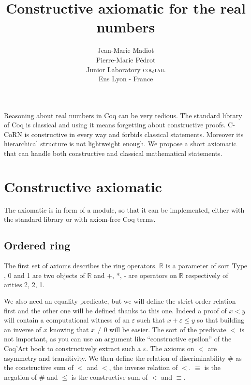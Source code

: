 \documentclass[a4paper,11pt]{article}
\newcommand{\R}{\mathbb{R}}
\newcommand{\Type}{\mbox{Type}}
\newcommand{\coqtail}{\textsc{coqtail}}
\theoremstyle{definition}
\theoremstyle{remark}
\begin{document}
\title{Constructive axiomatic for the real numbers}
\author{
Jean-Marie Madiot\\
Pierre-Marie Pédrot\\
Junior Laboratory \coqtail{}\\
Ens Lyon - France\\}

\maketitle 

  Reasoning about real numbers in Coq can be very tedious. The standard library of Coq is classical and using it means forgetting about constructive proofs. C-CoRN is constructive in every way and forbids classical statements. Moreover its hierarchical structure is not lightweight enough. We propose a short axiomatic that can handle both constructive and classical mathematical statements.

\section{Constructive axiomatic}

The axiomatic is in form of a module, so that it can be implemented, either with the standard library or with axiom-free Coq terms.

\subsection{Ordered ring}

The first set of axioms describes the ring operators. $\R$ is a parameter of sort $\Type$, 0 and 1 are two objects of $\R$ and +, *, - are operators on $\R$ respectively of arities 2, 2, 1.

We also need an equality predicate, but we will define the strict order relation first and the other one will be defined thanks to this one. Indeed a proof of $x<y$ will contain a computational witness of an $\varepsilon$ such that $x+\varepsilon≤y$ so that building an inverse of $x$ knowing that $x\neq 0$ will be easier. The sort of the predicate $<$ is not important, as you can use an argument like ``constructive epsilon'' of the Coq’Art book to constructively extract such a $\varepsilon$. The axioms on $<$ are asymmetry and transitivity. We then define the relation of discriminability $\#$ as the constructive sum of $<$ and $<$, the inverse relation of $<$. $≡$ is the negation of $\#$ and $≤$ is the constructive sum of $<$ and $≡$.
\end{document}
